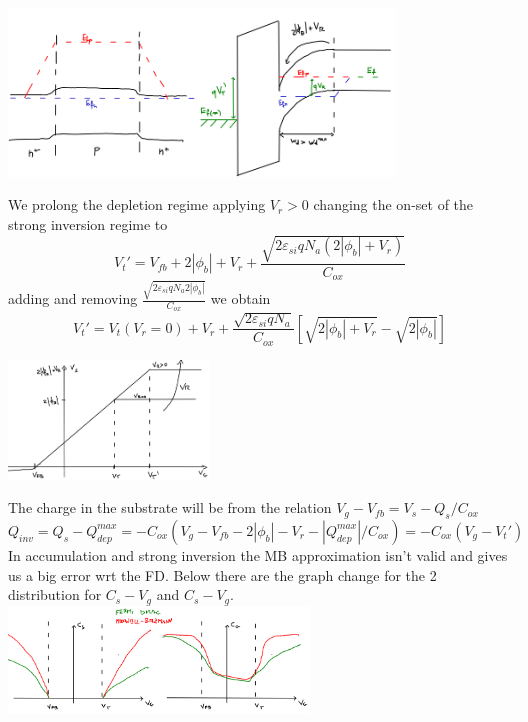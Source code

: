 \centering
\includegraphics[width=0.77\textwidth]{what3.png}\\
\raggedright
We prolong the depletion regime applying $V_r>0$ changing the on-set of the strong inversion regime to 
\begin{equation}
V_t'=V_{fb}+2|\phi_b|+V_r+\frac{\sqrt{2\varepsilon_{si}qN_a(2|\phi_b|+V_r)}}{C_{ox}}
\end{equation}
adding and removing $\frac{\sqrt{2\varepsilon_{si}qN_a2|\phi_b|}}{C_{ox}}$ we obtain
\begin{equation}
V_t'=V_t(V_r=0)+V_r+\frac{\sqrt{2\varepsilon_{si}qN_a}}{C_{ox}}[\sqrt{2|\phi_b|+V_r}-\sqrt{2|\phi_b|}]
\end{equation}

\centering
\includegraphics[width=0.4\textwidth]{vtprimo.png}\\
\raggedright

The charge in the substrate will be from the relation $V_g-V_{fb}=V_s-Q_s/C_{ox}$ 
\begin{equation}
Q_{inv}=Q_s-Q_{dep}^{max}=-C_{ox}(V_g-V_{fb}-2|\phi_b|-V_r-|Q_{dep}^{max}|/C_{ox})=-C_{ox}(V_g-V_t')
\end{equation}
In accumulation and strong inversion the MB approximation isn't valid and gives us a big error wrt the FD. Below there are the graph change for the 2 distribution for $C_s-V_g$ and $C_s-V_g$.\\

\centering
\includegraphics[width=0.6\textwidth]{mbvsfdmos.png}\\
\raggedright


